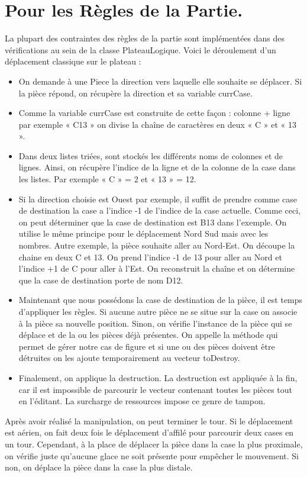 \documentclass[titlepage]{report}
\begin{document}
\section{Pour les Règles de la Partie. }
La plupart des contraintes des règles de la partie sont implémentées dans des vérifications au sein de la classe PlateauLogique. 
\noindent Voici le déroulement d’un déplacement classique sur le plateau :
\begin{itemize}[label=$\bullet$]
    \setlength\itemsep{1em}
    \item On demande à une Piece la direction vers laquelle elle souhaite se déplacer. Si la pièce répond, on récupère la direction et sa variable currCase.
    \item Comme la variable currCase est construite de cette façon : colonne + ligne par exemple « C13 » on divise la chaîne de caractères en deux « C » et « 13 ». 
    \item Dans deux listes triées, sont stockés les différents noms de colonnes et de lignes. Ainsi, on récupère l’indice de la ligne et de la colonne de la case dans les listes. Par exemple « C » = 2 et « 13 » = 12. 
    \item Si la direction choisie est Ouest par exemple, il suffit de prendre comme case de destination la case a l’indice -1 de l’indice de la case actuelle. Comme ceci, on peut déterminer que la case de destination est B13 dans l’exemple. On utilise le même principe pour le déplacement Nord Sud mais avec les nombres.  Autre exemple, la pièce souhaite aller au Nord-Est. On découpe la chaine en deux C et 13. On prend l’indice -1 de 13 pour aller au Nord et l’indice +1 de C pour aller à l’Est. On reconstruit la chaîne et on détermine que la case de destination porte de nom D12. 
    \item Maintenant que nous possédons la case de destination de la pièce, il est temps d’appliquer les règles. Si aucune autre pièce ne se situe sur la case on associe à la pièce sa nouvelle position. Sinon, on vérifie l’instance de la pièce qui se déplace et de la ou les pièces déjà présentes. On appelle la méthode qui permet de gérer notre cas de figure et si une ou des pièces doivent être détruites on les ajoute temporairement au vecteur toDestroy.
    \item Finalement, on applique la destruction. La destruction est appliquée à la fin, car il est impossible de parcourir le vecteur contenant toutes les pièces tout en l’éditant. La surcharge de ressources impose ce genre de tampon.  
\end{itemize}
Après avoir réalisé la manipulation, on peut terminer le tour. Si le déplacement est aérien, on fait deux fois le déplacement d’affilé pour parcourir deux cases en un tour. Cependant, à la place de déplacer la pièce dans la case la plus proximale, on vérifie juste qu’aucune glace ne soit présente pour empêcher le mouvement. Si non, on déplace la pièce dans la case la plus distale. 
\end{document}

